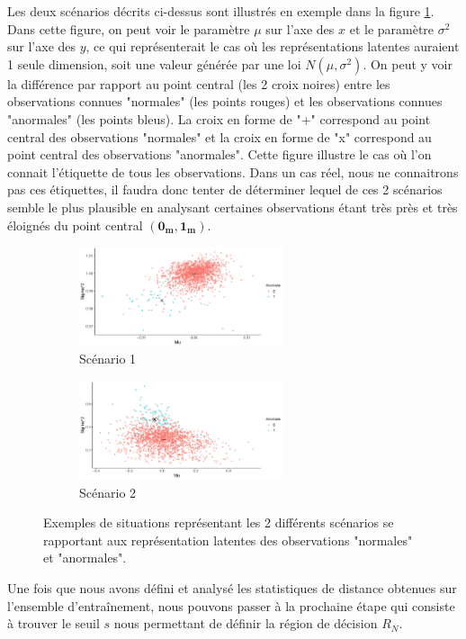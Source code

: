 Les deux scénarios décrits ci-dessus sont illustrés en exemple dans la figure \ref{fig:scenarios}. Dans cette figure, on peut voir le paramètre $\mu$ sur l'axe des $x$ et le paramètre $\sigma^2$ sur l'axe des $y$, ce qui représenterait le cas où les représentations latentes auraient 1 seule dimension, soit une valeur générée par une loi $N(\mu, \sigma^2)$. On peut y voir la différence par rapport au point central (les 2 croix noires) entre les observations connues "normales" (les points rouges) et les observations connues "anormales" (les points bleus).  La croix en forme de "+" correspond au point central des observations "normales" et la croix en forme de "x" correspond au point central des observations "anormales". Cette figure illustre le cas où l'on connait l'étiquette de tous les observations. Dans un cas réel, nous ne connaitrons pas ces étiquettes, il faudra donc tenter de déterminer lequel de ces 2 scénarios semble le plus plausible en analysant certaines observations étant très près et très éloignés du point central $(\boldsymbol{0_m}, \boldsymbol{1_m})$.

\begin{figure} [h]
	\centering
	\begin{subfigure}{6cm}
		\includegraphics[width=6cm]{images/plot_near.pdf}
		\caption{Scénario 1}
	\end{subfigure}
	\begin{subfigure}{6cm}
		\includegraphics[width=6cm]{images/plot_away.pdf}
		\caption{Scénario 2}
	\end{subfigure}
	\caption{Exemples de situations représentant les 2 différents scénarios se rapportant  aux représentation latentes des observations "normales" et "anormales".}
	\label{fig:scenarios}
\end{figure}

Une fois que nous avons défini et analysé les statistiques de distance obtenues sur l'ensemble d'entraînement, nous pouvons passer à la prochaine étape qui consiste à trouver le seuil $s$ nous permettant de définir la région de décision $R_N$.

